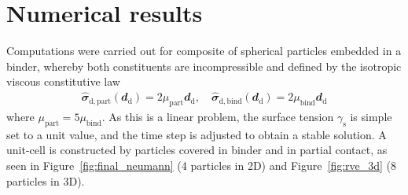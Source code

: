 \documentclass[12pt,a4paper]{article}
\renewcommand{\ts}[1]{\mathbfit{#1}}
\newcommand{\figref}[1]{Figure~\ref{#1}}
\renewcommand{\dev}{\mathrm{d}}
\newcommand{\surf}{\mathrm{s}}
\newcommand{\particle}{\mathrm{part}}
\begin{document}
\section{Numerical results}
\newcommand{\binder}{\mathrm{bind}}

Computations were carried out for composite of spherical particles embedded in a binder, whereby both constituents are incompressible and defined by the isotropic viscous constitutive law
\begin{align}
 \hat{\ts\sigma}_{\dev,\particle}(\ts d_\dev) = 2 \mu_\particle \ts d_\dev
,\quad
 \hat{\ts\sigma}_{\dev,\binder}(\ts d_\dev) = 2 \mu_\binder \ts d_\dev
\end{align}
where $\mu_\particle = 5\mu_\binder$.
As this is a linear problem, the surface tension $\gamma_\surf$ is simple set to a unit value, and the time step is adjusted to obtain a stable solution.
A unit-cell is constructed by particles covered in binder and in partial contact, as seen in \figref{fig:final_neumann} (4 particles in 2D) and \figref{fig:rve_3d} (8 particles in 3D).

\end{document}
